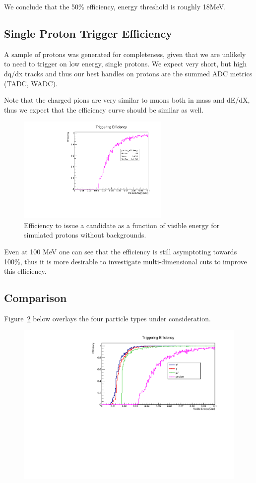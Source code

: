 \documentclass[10pt]{article}
\begin{document}
We conclude that the 50\% efficiency, energy threshold is roughly 18MeV. 

\subsection{Single Proton Trigger Efficiency}

A sample of protons was generated for completeness, given that we are unlikely to need to trigger on low energy, single protons. 
We expect very short, but high dq/dx tracks and thus our best handles on protons are the summed ADC metrics (TADC, WADC). 

Note that the charged pions are very similar to muons both in mass and dE/dX, thus we expect that the efficiency curve should be similar as well. 

\begin{figure}[H]
    \centering
    \includegraphics[angle=270,width=0.65\textwidth]{UpdatedEff/SingleParticle/proton_efficiency.pdf}
    \caption{Efficiency to issue a candidate as a function of visible energy for simulated protons without backgrounds.}
    \label{fig:eff_proton}
\end{figure}

Even at 100 MeV one can see that the efficiency is still asymptoting towards 100\%, thus it is more desirable to investigate multi-dimensional cuts to improve this efficiency. 


\subsection{Comparison}

Figure~\ref{fig:comparison} below overlays the four particle types under consideration.

\begin{figure}
    \centering
    \includegraphics[angle=270,width=\textwidth]{UpdatedEff/SingleParticle//efficiency_comparison_mu_e_gamma_proton_2.pdf}
    \label{fig:comparison}
\end{figure}
\end{document}
